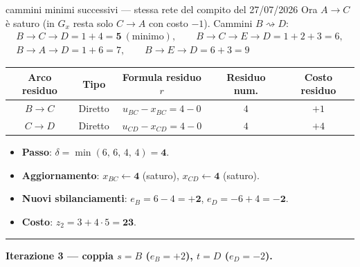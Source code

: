 \documentclass[11pt,a4paper]{article}
\newcommand{\mcfnodes}{%
  \node[nd] (A) at (0,2.1) {$A$};
  \node[nd] (B) at (0,-2.1) {$B$};
  \node[nd] (C) at (3.0,0) {$C$};
  \node[nd] (D) at (6.0,2.1) {$D$};
  \node[nd] (E) at (6.0,-2.1) {$E$};}
\newcommand{\ra}[4]{\draw[#1,thick,black!65] (#2) -- node[font=\scriptsize,black!70,fill=amber!5,inner sep=1pt]{$#4$} (#3);}
\newcommand{\cy}[3]{\draw[->,line width=1.2pt,crimson] (#1) to[bend left=16] node[font=\scriptsize,crimson,fill=amber!5,inner sep=1pt]{$#3$} (#2);}
\begin{document}
\begin{es}{cammini minimi successivi --- stessa rete del compito del 27/07/2026}
Ora $A\to C$ è saturo (in $G_x$ resta solo $C\to A$ con costo $-1$). Cammini $B\rightsquigarrow D$:
\begin{gather*}
B\!\to\!C\!\to\!D = 1+4 = \mathbf{5}\ (\text{minimo}),\qquad
B\!\to\!C\!\to\!E\!\to\!D = 1+2+3 = 6,\\
B\!\to\!A\!\to\!D = 1+6 = 7,\qquad
B\!\to\!E\!\to\!D = 6+3 = 9
\end{gather*}
\begin{center}
\small
\begin{tabular}{@{}ccccc@{}}
\toprule
\textbf{Arco residuo} & \textbf{Tipo} & \textbf{Formula residuo $r$} & \textbf{Residuo num.} & \textbf{Costo residuo}\\
\midrule
$B \to C$ & Diretto & $u_{BC}-x_{BC} = 4-0$ & $4$ & $+1$\\
$C \to D$ & Diretto & $u_{CD}-x_{CD} = 4-0$ & $4$ & $+4$\\
\bottomrule
\end{tabular}
\end{center}
\begin{itemize}[itemsep=0.15em]
\item \textbf{Passo}: $\delta = \min(6,\,6,\,4,\,4) = \mathbf{4}$.
\item \textbf{Aggiornamento}: $x_{BC}\leftarrow \mathbf{4}$ (saturo), \quad $x_{CD}\leftarrow \mathbf{4}$ (saturo).
\item \textbf{Nuovi sbilanciamenti}: $e_B = 6-4 = \mathbf{+2}$, \quad $e_D = -6+4 = \mathbf{-2}$.
\item \textbf{Costo}: $z_2 = 3 + 4\cdot 5 = \mathbf{23}$.
\end{itemize}

\begin{center}
\par\vspace{1mm}{\scriptsize $G_x$ post it. 1: evidenziato $B\to C\to D$ ($c=5$, $\delta=4$)}
\end{center}

\medskip
\hrule
\medskip

\textbf{Iterazione 3 --- coppia $s=B$ ($e_B=+2$), $t=D$ ($e_D=-2$).}


\end{es}
\end{document}

